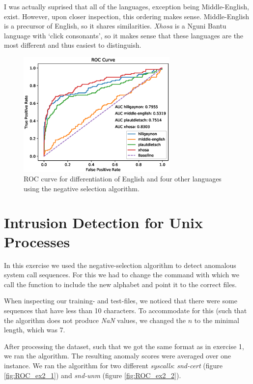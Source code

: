 \documentclass[11pt]{article}
\begin{document}
\begin{enumerate}[1.]
I was actually suprised that all of the languages, exception being Middle-English, exist. However, upon closer inspection, this ordering makes sense. Middle-English is a precursor of English, so it shares similarities. \textit{Xhosa} is a Nguni Bantu language with `click consonants', so it makes sense that these languages are the most different and thus easiest to distinguish.

\begin{figure}[H]
\centering
\includegraphics[width=0.7\textwidth]{images/roc_ex1_3.eps}
\caption{ROC curve for differentiation of English and four other languages using the negative selection algorithm.}
\label{fig:ROC_ex1_3}
\end{figure}

\end{enumerate}

\newpage

\section{Intrusion Detection for Unix Processes}
In this exercise we used the negative-selection algorithm to detect anomalous system call sequences. For this we had to change the command with which we call the function to include the new alphabet and point it to the correct files.

When inspecting our training- and test-files, we noticed that there were some sequences that have less than 10 characters. To accommodate for this (such that the algorithm does not produce \textit{NaN} values, we changed the $n$ to the minimal length, which was 7.

After processing the dataset, such that we got the same format as in exercise 1, we ran the algorithm. The resulting anomaly scores were averaged over one instance. We ran the algorithm for two different \textit{syscalls}: \textit{snd-cert} (figure \ref{fig:ROC_ex2_1}) and \textit{snd-unm} (figure \ref{fig:ROC_ex2_2}).
\end{document}
